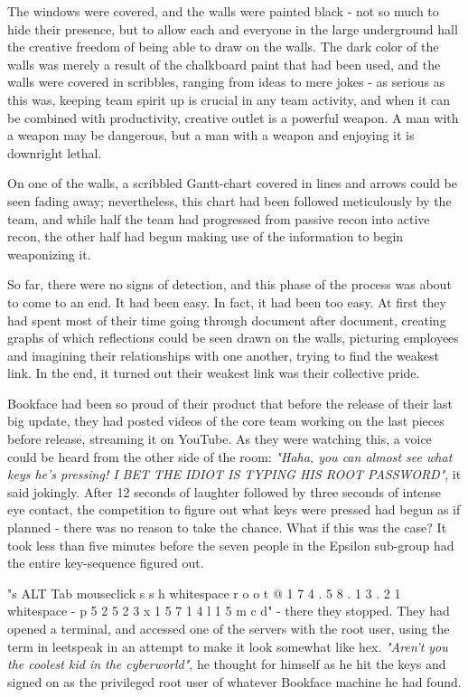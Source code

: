 The windows were covered, and the walls were painted black - not so much to hide their presence, but to allow each and everyone in the large underground hall the creative freedom of being able to draw on the walls. The dark color of the walls was merely a result of the chalkboard paint that had been used, and the walls were covered in scribbles, ranging from ideas to mere jokes - as serious as this was, keeping team spirit up is crucial in any team activity, and when it can be combined with productivity, creative outlet is a powerful weapon. A man with a weapon may be dangerous, but a man with a weapon and enjoying it is downright lethal. 

On one of the walls, a scribbled Gantt-chart covered in lines and arrows could be seen fading away; nevertheless, this chart had been followed meticulously by the team, and while half the team had progressed from passive recon into active recon, the other half had begun making use of the information to begin weaponizing it. 

So far, there were no signs of detection, and this phase of the process was about to come to an end. It had been easy. In fact, it had been too easy. At first they had spent most of their time going through document after document, creating graphs of which reflections could be seen drawn on the walls, picturing employees and imagining their relationships with one another, trying to find the weakest link. In the end, it turned out their weakest link was their collective pride. 

Bookface had been so proud of their product that before the release of their last big update, they had posted videos of the core team working on the last pieces before release, streaming it on YouTube. As they were watching this, a voice could be heard from the other side of the room: \textit{"Haha, you can almost see what keys he's pressing! I BET THE IDIOT IS TYPING HIS ROOT PASSWORD"}, it said jokingly. After 12 seconds of laughter followed by three seconds of intense eye contact, the competition to figure out what keys were pressed had begun as if planned - there was no reason to take the chance. What if this was the case? It took less than five minutes before the seven people in the Epsilon sub-group had the entire key-sequence figured out.

"s ALT Tab mouseclick s s h whitespace r o o t @ 1 7 4 . 5 8 . 1 3 . 2 1 whitespace - p 5 2 5 2 3 x 1 5 7 1 4 l 1 5 m c d" - there they stopped. They had opened a terminal, and accessed one of the servers with the root user, using the term  in leetspeak in an attempt to make it look somewhat like hex. \textit{"Aren't you the coolest kid in the cyberworld"}, he thought for himself as he hit the keys and signed on as the privileged root user of whatever Bookface machine he had found.   

